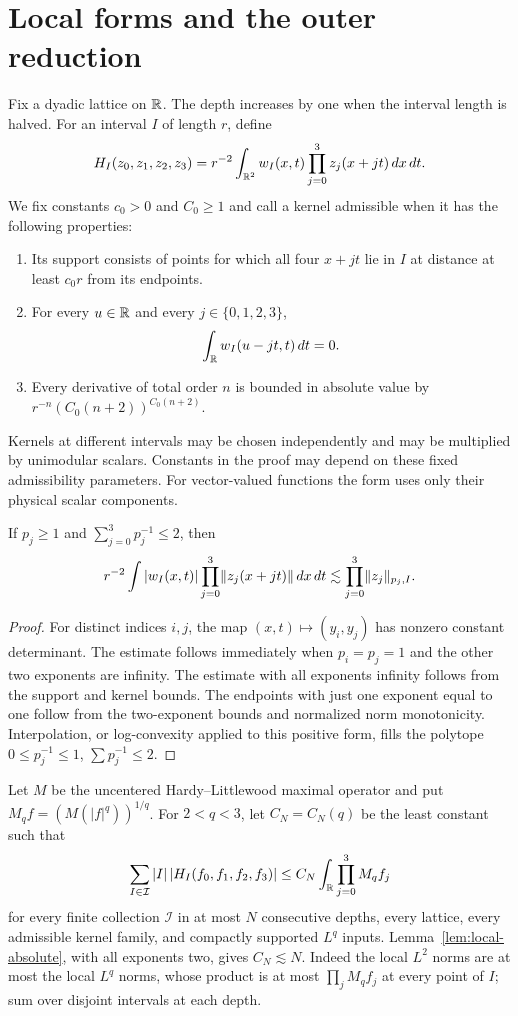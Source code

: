 \section{Local forms and the outer reduction}\label{sec:outer}
Fix a dyadic lattice on $\mathbb R$.  The depth increases by one when the interval
length is halved.  For an interval $I$ of length $r$, define
\[
 H_I(z_0,z_1,z_2,z_3)
 =r^{-2}\int_{\mathbb R^2}w_I(x,t)\prod_{j=0}^3z_j(x+jt)\,dx\,dt.
\]
We fix constants $c_0>0$ and $C_0\ge1$ and call a kernel admissible when
it has the following properties:
\begin{enumerate}
\item Its support consists of points for which all four $x+jt$ lie in
$I$ at distance at least $c_0r$ from its endpoints.
\item For every $u\in\mathbb R$ and every $j\in\{0,1,2,3\}$,
\[
 \int_{\mathbb R}w_I(u-jt,t)\,dt=0.
\]
\item Every derivative of total order $n$ is bounded in absolute value by
$r^{-n}(C_0(n+2))^{C_0(n+2)}$.
\end{enumerate}
Kernels at different intervals may be chosen independently and may be
multiplied by unimodular scalars.  Constants in the proof may depend on
these fixed admissibility parameters.  For vector-valued functions the
form uses only their physical scalar components.

\begin{lemma}\label{lem:local-absolute}
If $p_j\ge1$ and $\sum_{j=0}^3p_j^{-1}\le2$, then
\[
 r^{-2}\int |w_I(x,t)|\prod_{j=0}^3\lVert z_j(x+jt)\rVert\,dx\,dt
 \lesssim\prod_{j=0}^3\lVert z_j\rVert_{p_j,I}.
\]
\end{lemma}
\begin{proof}
For distinct indices $i,j$, the map $(x,t)\mapsto(y_i,y_j)$ has
nonzero constant determinant.  The estimate follows immediately when
$p_i=p_j=1$ and the other two exponents are infinity.  The estimate with
all exponents infinity follows from the support and kernel bounds.
The endpoints with just one exponent equal to one follow from the
two-exponent bounds and normalized norm monotonicity.
Interpolation, or log-convexity applied to this positive form, fills the
polytope $0\le p_j^{-1}\le1$, $\sum p_j^{-1}\le2$.
\end{proof}

Let $M$ be the uncentered Hardy--Littlewood maximal operator and put
$M_qf=(M(|f|^q))^{1/q}$.  For $2<q<3$, let $C_N=C_N(q)$ be the least
constant such that
\[
 \sum_{I\in\mathcal I}|I|\,|H_I(f_0,f_1,f_2,f_3)|
 \le C_N\int_{\mathbb R}\prod_{j=0}^3 M_qf_j
\]
for every finite collection $\mathcal I$ in at most $N$ consecutive
depths, every lattice, every admissible kernel family, and compactly
supported $L^q$ inputs.  Lemma~\ref{lem:local-absolute}, with all
exponents two, gives $C_N\lesssim N$.  Indeed the local $L^2$ norms
are at most the local $L^q$ norms, whose product is at most
$\prod_jM_qf_j$ at every point of $I$; sum over disjoint intervals at
each depth.

